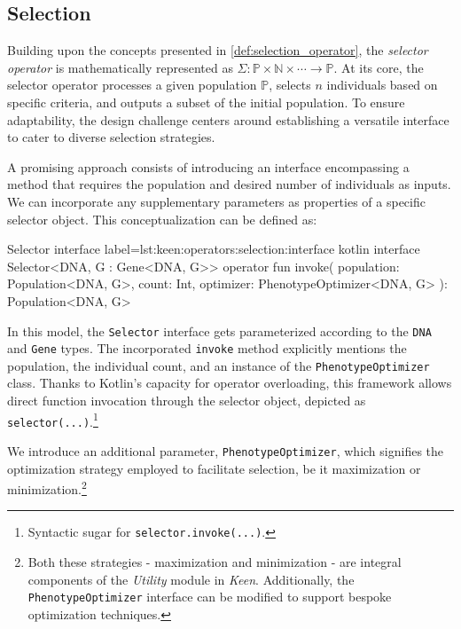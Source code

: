 \subsection{Selection}
\label{sec:keen:operators:selection}
  Building upon the concepts presented in \vref{def:selection_operator}, the 
  \emph{selector operator} is mathematically represented as \(\Sigma : \mathbb
  {P} \times \mathbb{N} \times \cdots \to \mathbb{P}\).
  At its core, the selector operator processes a given population 
  \(\mathbb{P}\), selects \(n\) individuals based on specific criteria, and 
  outputs a subset of the initial population.
  To ensure adaptability, the design challenge centers around establishing a 
  versatile interface to cater to diverse selection strategies.

  A promising approach consists of introducing an interface encompassing a 
  method that requires the population and desired number of individuals as 
  inputs.
  We can incorporate any supplementary parameters as properties of a specific 
  selector object.
  This conceptualization can be defined as:

  \begin{code}{Selector interface}{
    label=lst:keen:operators:selection:interface
  }{kotlin}
    interface Selector<DNA, G : Gene<DNA, G>> {
      operator fun invoke(
          population: Population<DNA, G>,
          count: Int,
          optimizer: PhenotypeOptimizer<DNA, G>
      ): Population<DNA, G>
    }
  \end{code}

  In this model, the \texttt{Selector} interface gets parameterized according 
  to the \texttt{DNA} and \texttt{Gene} types.
  The incorporated \texttt{invoke} method explicitly mentions the population, 
  the individual count, and an instance of the \texttt{PhenotypeOptimizer} 
  class.
  Thanks to Kotlin's capacity for operator overloading, this framework allows 
  direct function invocation through the selector object, depicted as \texttt
  {selector(...)}.\footnote{Syntactic sugar for \texttt{selector.invoke(...)}.}

  We introduce an additional parameter, \texttt{PhenotypeOptimizer}, which 
  signifies the optimization strategy employed to facilitate selection, be it 
  maximization or minimization.\footnote{
    Both these strategies - maximization and minimization - are integral 
    components of the \textit{Utility} module in \textit{Keen}.
    Additionally, the \texttt{PhenotypeOptimizer} interface can be modified to 
    support bespoke optimization techniques.
  }

